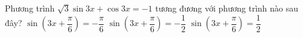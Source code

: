 \begin{ex}%
	Phương trình $\sqrt{3}\sin3x + \cos 3x =  - 1$ tương đương với phương trình nào sau đây?
	{$\sin \left(3x + \dfrac{\pi }{6} \right) =  - \dfrac{\pi }{6}$}
	{\True $\sin \left( 3x + \dfrac{\pi }{6}\right) =  - \dfrac{1}{2}$}
	{$\sin \left(3x + \dfrac{\pi }{6}\right) = \dfrac{1}{2 }$}
	\end{ex}
	

